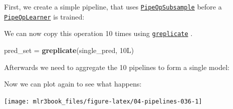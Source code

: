 \documentclass[]{article}
\newenvironment{Shaded}{\begin{snugshade}}{\end{snugshade}}
\newcommand{\DataTypeTok}[1]{\textcolor[rgb]{0.13,0.29,0.53}{#1}}
\newcommand{\FloatTok}[1]{\textcolor[rgb]{0.00,0.00,0.81}{#1}}
\newcommand{\KeywordTok}[1]{\textcolor[rgb]{0.13,0.29,0.53}{\textbf{#1}}}
\newcommand{\NormalTok}[1]{#1}
\newcommand{\OperatorTok}[1]{\textcolor[rgb]{0.81,0.36,0.00}{\textbf{#1}}}
\newcommand{\OtherTok}[1]{\textcolor[rgb]{0.56,0.35,0.01}{#1}}
\newcommand{\StringTok}[1]{\textcolor[rgb]{0.31,0.60,0.02}{#1}}
\renewenvironment{Shaded} {\begin{snugshade}\small} {\end{snugshade}}
\begin{document}
First, we create a simple pipeline, that uses \href{https://mlr3pipelines.mlr-org.com/reference/mlr_pipeops_subsample.html}{\texttt{PipeOpSubsample}} before a \href{https://mlr3pipelines.mlr-org.com/reference/mlr_pipeops_learner.html}{\texttt{PipeOpLearner}} is trained:

\begin{Shaded}
\end{Shaded}

We can now copy this operation 10 times using \href{https://mlr3pipelines.mlr-org.com/reference/greplicate.html}{\texttt{greplicate}} .

\begin{Shaded}
\begin{Highlighting}[]
\NormalTok{pred_set =}\StringTok{ }\KeywordTok{greplicate}\NormalTok{(single_pred, 10L)}
\end{Highlighting}
\end{Shaded}

Afterwards we need to aggregate the 10 pipelines to form a single model:

\begin{Shaded}
\end{Shaded}

Now we can plot again to see what happens:

\begin{Shaded}
\end{Shaded}

\begin{center}\texttt{[image: mlr3book\_files/figure-latex/04-pipelines-036-1]} \end{center}
\end{document}
